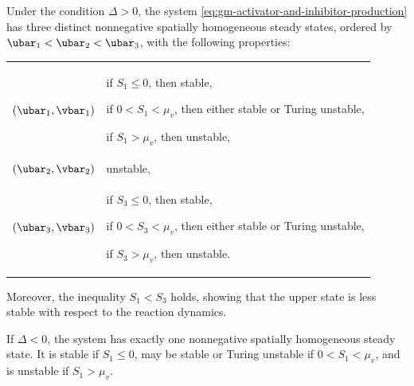 \begin{proposition}
\label{prop:activator-production-steady-states}
Under the condition \(\Delta>0\), the system
\eqref{eq:gm-activator-and-inhibitor-production} has three distinct
nonnegative spatially homogeneous steady states, ordered by
\(\ubar_1<\ubar_2<\ubar_3\), with the following properties:
\begin{center}
    \begin{tabular}{@{}>{\centering\arraybackslash}m{}
                        @{\qquad}m{}@{}}
        \((\ubar_1,\vbar_1)\) &
        if \(S_1\leqslant0\), then stable,\par\vspace{0.2em}
        if \(0<S_1<\mu_v\), then either stable or Turing unstable,\par\vspace{0.2em}
        if \(S_1>\mu_v\), then unstable,
        \\[2.0em]
        \((\ubar_2,\vbar_2)\) & unstable, \\[0.5em]
        \((\ubar_3,\vbar_3)\) &
        if \(S_3\leqslant0\), then stable,\par\vspace{0.2em}
        if \(0<S_3<\mu_v\), then either stable or Turing unstable,\par\vspace{0.2em}
        if \(S_3>\mu_v\), then unstable.
    \end{tabular}
\end{center}
Moreover, the inequality \(S_1<S_3\) holds, showing that the upper state is
less stable with respect to the reaction dynamics.

If \(\Delta<0\), the system has exactly one nonnegative spatially homogeneous
steady state. It is stable if \(S_1\leqslant0\), may be
stable or Turing unstable if \(0<S_1<\mu_v\), and is unstable if
\(S_1>\mu_v\).
\end{proposition}

